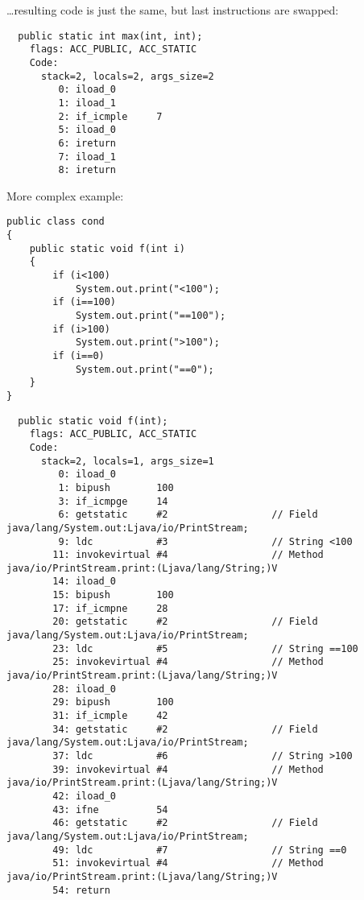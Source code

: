\dots resulting code is just the same, but last  instructions are swapped:

\begin{lstlisting}
  public static int max(int, int);
    flags: ACC_PUBLIC, ACC_STATIC
    Code:
      stack=2, locals=2, args_size=2
         0: iload_0       
         1: iload_1       
         2: if_icmple     7
         5: iload_0       
         6: ireturn       
         7: iload_1       
         8: ireturn       
\end{lstlisting}

More complex example:

\begin{lstlisting}
public class cond
{
	public static void f(int i)
	{
		if (i<100)
			System.out.print("<100");
		if (i==100)
			System.out.print("==100");
		if (i>100)
			System.out.print(">100");
		if (i==0)
			System.out.print("==0");
	}
}
\end{lstlisting}

\begin{lstlisting}
  public static void f(int);
    flags: ACC_PUBLIC, ACC_STATIC
    Code:
      stack=2, locals=1, args_size=1
         0: iload_0       
         1: bipush        100
         3: if_icmpge     14
         6: getstatic     #2                  // Field java/lang/System.out:Ljava/io/PrintStream;
         9: ldc           #3                  // String <100
        11: invokevirtual #4                  // Method java/io/PrintStream.print:(Ljava/lang/String;)V
        14: iload_0       
        15: bipush        100
        17: if_icmpne     28
        20: getstatic     #2                  // Field java/lang/System.out:Ljava/io/PrintStream;
        23: ldc           #5                  // String ==100
        25: invokevirtual #4                  // Method java/io/PrintStream.print:(Ljava/lang/String;)V
        28: iload_0       
        29: bipush        100
        31: if_icmple     42
        34: getstatic     #2                  // Field java/lang/System.out:Ljava/io/PrintStream;
        37: ldc           #6                  // String >100
        39: invokevirtual #4                  // Method java/io/PrintStream.print:(Ljava/lang/String;)V
        42: iload_0       
        43: ifne          54
        46: getstatic     #2                  // Field java/lang/System.out:Ljava/io/PrintStream;
        49: ldc           #7                  // String ==0
        51: invokevirtual #4                  // Method java/io/PrintStream.print:(Ljava/lang/String;)V
        54: return        
\end{lstlisting}

